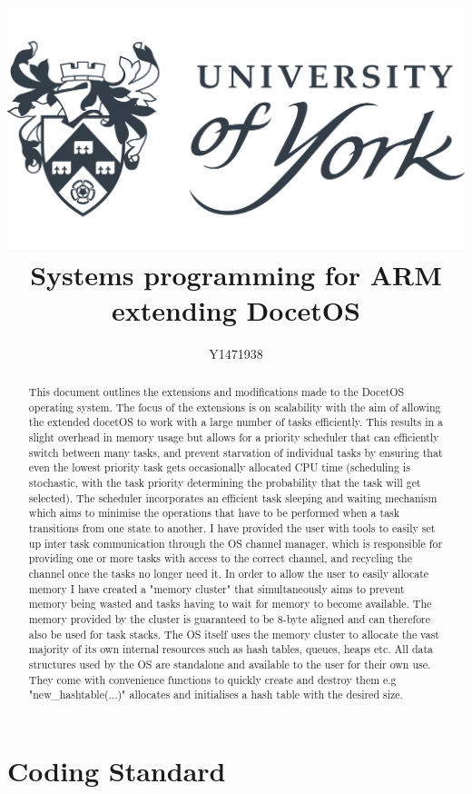 \documentclass[12pt,a4paper]{article}
\author{Y1471938}
\title{
\includegraphics[width=\textwidth]{images/yorkUniLogo.png}\\
\textbf{Systems programming for ARM}\\ extending DocetOS}
\begin{document}
\maketitle
\begin{abstract}
This document outlines the extensions and modifications made to the DocetOS operating system. The focus of the extensions is on scalability with the aim of allowing the extended docetOS to work with a large number of tasks efficiently. This results in a slight overhead in memory usage but allows for a priority scheduler that can efficiently switch between many tasks, and prevent starvation of individual tasks by ensuring that even the lowest priority task gets occasionally allocated CPU time (scheduling is stochastic, with the task priority determining the probability that the task will get selected). The scheduler incorporates an efficient task sleeping and waiting mechanism which aims to minimise the operations that have to be performed when a task transitions from one state to another. I have provided the user with tools to easily set up inter task communication through the OS channel manager, which is responsible for providing one or more tasks with access to the correct channel, and recycling the channel once the tasks no longer need it. In order to allow the user to easily allocate memory I have created a "memory cluster" that simultaneously aims to prevent memory being wasted and tasks having to wait for memory to become available. The memory provided by the cluster is guaranteed to be 8-byte aligned and can therefore also be used for task stacks. The OS itself uses the memory cluster to allocate the vast majority of its own internal resources such as hash tables, queues, heaps etc. All data structures used by the OS are standalone and available to the user for their own use. They come with convenience functions to quickly create and destroy them e.g "new\_hashtable(...)" allocates and initialises a hash table with the desired size.
\end{abstract}
\pagebreak
\tableofcontents
\pagebreak
\section{Coding Standard}
\end{document}
